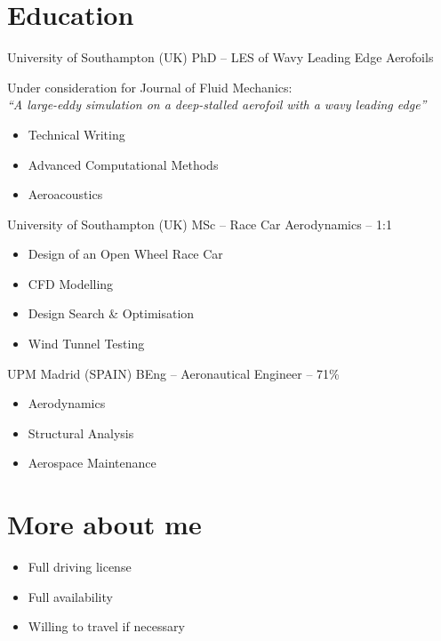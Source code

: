\documentclass[fontsize=10pt]{tccv}
\begin{document}
\section{Education}
\begin{eventlist}
     	{University of Southampton (UK)}
     	{PhD -- \normalsize{LES of Wavy Leading Edge Aerofoils}} 

Under consideration for Journal of Fluid Mechanics:\\ \emph{``A large-eddy simulation on a
deep-stalled aerofoil with a wavy leading edge''}

	\begin{itemize}
	\itemsep -1pt
		\item Technical Writing
		\item Advanced Computational Methods
		\item Aeroacoustics
	\end{itemize}

     	{University of Southampton (UK)}
     	{MSc -- Race Car Aerodynamics -- 1:1} 
  	\begin{itemize}
	\itemsep -1pt
	   \item Design of an Open Wheel Race Car
	   \item CFD Modelling
	   \item Design Search \& Optimisation
	   \item Wind Tunnel Testing
	\end{itemize}

	{UPM Madrid (SPAIN)}
	{BEng -- Aeronautical Engineer -- 71\%}
  	\begin{itemize}
	\itemsep -1pt
	   \item Aerodynamics
	   \item Structural Analysis
	   \item Aerospace Maintenance
	\end{itemize}
\end{eventlist}

\vspace{-20pt}
\section{More about me} 
\begin{itemize}
	\itemsep -1pt
	\item Full driving license
	\item Full availability
	\item Willing to travel if necessary
\end{itemize}
\end{document}
